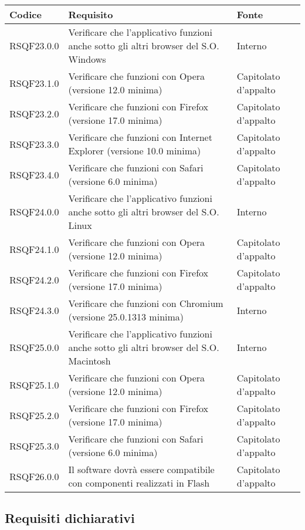 \begin{center}
\begin{longtable}{lp{}l}
\toprule Codice & Requisito & Fonte\\
\midrule
RSQF23.0.0 & Verificare che l'applicativo funzioni anche sotto gli altri browser del S.O. Windows & Interno \\
RSQF23.1.0 & Verificare che funzioni con Opera (versione 12.0 minima) & Capitolato d'appalto \\
RSQF23.2.0 & Verificare che funzioni con Firefox (versione 17.0 minima) & Capitolato d'appalto \\
RSQF23.3.0 & Verificare che funzioni con Internet Explorer (versione 10.0 minima) & Capitolato d'appalto \\
RSQF23.4.0 & Verificare che funzioni con Safari (versione 6.0 minima) & Capitolato d'appalto \\
RSQF24.0.0 & Verificare che l'applicativo funzioni anche sotto gli altri browser del S.O. Linux & Interno \\
RSQF24.1.0 & Verificare che funzioni con Opera (versione 12.0 minima) & Capitolato d'appalto \\
RSQF24.2.0 & Verificare che funzioni con Firefox (versione 17.0 minima) & Capitolato d'appalto \\
RSQF24.3.0 & Verificare che funzioni con Chromium (versione 25.0.1313 minima) & Interno \\
RSQF25.0.0 & Verificare che l'applicativo funzioni anche sotto gli altri browser del S.O. Macintosh & Interno \\
RSQF25.1.0 & Verificare che funzioni con Opera (versione 12.0 minima) & Capitolato d'appalto \\
RSQF25.2.0 & Verificare che funzioni con Firefox (versione 17.0 minima) & Capitolato d'appalto \\
RSQF25.3.0 & Verificare che funzioni con Safari  (versione 6.0 minima) & Capitolato d'appalto \\
RSQF26.0.0 & Il software dovrà essere compatibile con componenti realizzati in Flash & Capitolato d'appalto \\
\bottomrule
\end{longtable}
\end{center}

\subsection{Requisiti dichiarativi}

